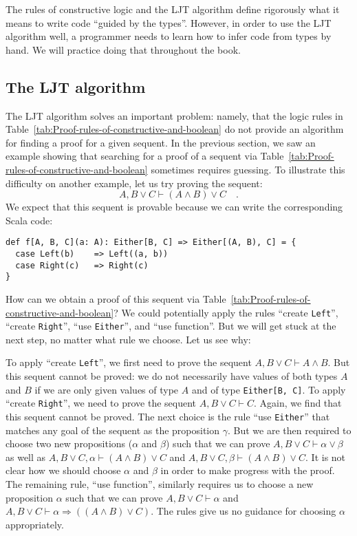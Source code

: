 The rules of constructive logic and the LJT algorithm define rigorously
what it means to write code \textsf{``}guided by the types\textsf{''}. However, in
order to use the LJT algorithm well, a programmer needs to learn how
to infer code from types by hand. We will practice doing that throughout
the book.

\subsection{The LJT algorithm\label{app:The-LJT-algorithm}}

The LJT algorithm solves an important problem: namely, that the logic
rules in Table~\ref{tab:Proof-rules-of-constructive-and-boolean}
do not provide an algorithm for finding a proof for a given sequent.
In the previous section, we saw an example showing that searching
for a proof of a sequent via Table~\ref{tab:Proof-rules-of-constructive-and-boolean}
sometimes requires guessing. To illustrate this difficulty on another
example, let us try proving the sequent:
\[
A,B\vee C\vdash(A\wedge B)\vee C\quad.
\]
We expect that this sequent is provable because we can write the corresponding
Scala code:
\begin{lstlisting}
def f[A, B, C](a: A): Either[B, C] => Either[(A, B), C] = {
  case Left(b)    => Left((a, b))
  case Right(c)   => Right(c)
}
\end{lstlisting}
How can we obtain a proof of this sequent via Table~\ref{tab:Proof-rules-of-constructive-and-boolean}?
We could potentially apply the rules \textsf{``}create \lstinline!Left!\textsf{''},
\textsf{``}create \lstinline!Right!\textsf{''}, \textsf{``}use \lstinline!Either!\textsf{''}, and
\textsf{``}use function\textsf{''}. But we will get stuck at the next step, no matter
what rule we choose. Let us see why:

To apply \textsf{``}create \lstinline!Left!\textsf{''}, we first need to prove the
sequent $A,B\vee C\vdash A\wedge B$. But this sequent cannot be proved:
we do not necessarily have values of both types $A$ and $B$ if we
are only given values of type $A$ and of type \lstinline!Either[B, C]!.
To apply \textsf{``}create \lstinline!Right!\textsf{''}, we need to prove the sequent
$A,B\vee C\vdash C$. Again, we find that this sequent cannot be proved.
The next choice is the rule \textsf{``}use \lstinline!Either!\textsf{''} that matches
any goal of the sequent as the proposition $\gamma$. But we are then
required to choose two new propositions ($\alpha$ and $\beta$) such
that we can prove $A,B\vee C\vdash\alpha\vee\beta$ as well as $A,B\vee C,\alpha\vdash(A\wedge B)\vee C$
and $A,B\vee C,\beta\vdash(A\wedge B)\vee C$. It is not clear how
we should choose $\alpha$ and $\beta$ in order to make progress
with the proof. The remaining rule, \textsf{``}use function\textsf{''}, similarly
requires us to choose a new proposition $\alpha$ such that we can
prove $A,B\vee C\vdash\alpha$ and $A,B\vee C\vdash\alpha\Rightarrow((A\wedge B)\vee C)$.
The rules give us no guidance for choosing $\alpha$ appropriately.

